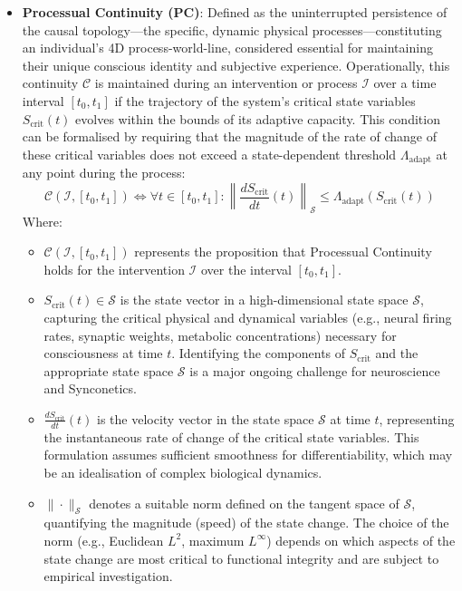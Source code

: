 \documentclass[10pt]{article}
\begin{document}
\begin{sloppypar}
\begin{itemize}
    \item \textbf{Processual Continuity (PC)}: Defined as the uninterrupted persistence of the causal topology—the specific, dynamic physical processes—constituting an individual’s 4D process-world-line, considered essential for maintaining their unique conscious identity and subjective experience. Operationally, this continuity \( \mathcal{C} \) is maintained during an intervention or process \( \mathcal{I} \) over a time interval \( [t_0, t_1] \) if the trajectory of the system’s critical state variables \( S_{\text{crit}}(t) \) evolves within the bounds of its adaptive capacity. This condition can be formalised by requiring that the magnitude of the rate of change of these critical variables does not exceed a state-dependent threshold \( \Lambda_{\text{adapt}} \) at any point during the process:
          \begin{equation}
            \mathcal{C}(\mathcal{I}, [t_0, t_1]) \iff \forall t \in [t_0, t_1] : \left\| \frac{dS_{\text{crit}}}{dt}(t) \right\|_{\mathcal{S}} \le \Lambda_{\text{adapt}}(S_{\text{crit}}(t))
            \label{eq:continuity}
          \end{equation}
          Where:
          \begin{itemize}
            \item \( \mathcal{C}(\mathcal{I}, [t_0, t_1]) \) represents the proposition that Processual Continuity holds for the intervention \( \mathcal{I} \) over the interval \( [t_0, t_1] \).
            \item \( S_{\text{crit}}(t) \in \mathcal{S} \) is the state vector in a high-dimensional state space \( \mathcal{S} \), capturing the critical physical and dynamical variables (e.g., neural firing rates, synaptic weights, metabolic concentrations) necessary for consciousness at time \( t \). Identifying the components of \( S_{\text{crit}} \) and the appropriate state space \( \mathcal{S} \) is a major ongoing challenge for neuroscience and Synconetics.
            \item \( \frac{dS_{\text{crit}}}{dt}(t) \) is the velocity vector in the state space \( \mathcal{S} \) at time \( t \), representing the instantaneous rate of change of the critical state variables. This formulation assumes sufficient smoothness for differentiability, which may be an idealisation of complex biological dynamics.
            \item \( \| \cdot \|_{\mathcal{S}} \) denotes a suitable norm defined on the tangent space of \( \mathcal{S} \), quantifying the magnitude (speed) of the state change. The choice of the norm (e.g., Euclidean \( L^2 \), maximum \( L^\infty \)) depends on which aspects of the state change are most critical to functional integrity and are subject to empirical investigation.

\end{itemize}
\end{itemize}
\end{sloppypar}
\end{document}
